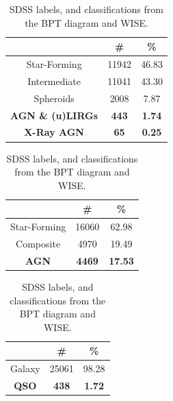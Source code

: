 \documentclass[letterpaper, oneside]{article}
\begin{document}
	\begin{table}[H]
		\begin{subtable}[h]{0.45\textwidth}
			\centering
			\begin{tabular}{ccc}
				\hline \hline
				& \# & \%      \\ \hline
				Star-Forming    & 11942         & 46.83 \\
				Intermediate    & 11041         & 43.30 \\
				Spheroids       & 2008          & 7.87  \\
				\textbf{AGN \& (u)LIRGs} & \textbf{443}           & \textbf{1.74}  \\
				\textbf{X-Ray AGN}       & \textbf{65}            & \textbf{0.25}  \\ \hline
			\end{tabular}
			\caption{Classifications from WISE imd-IR color selections by \cite{Jarrett_2017} and \cite{Mateos_2012, Mateos_2013}.}
			\label{tab:wise_labels}
		\end{subtable}
		\hfill
		\begin{subtable}[h]{0.45\textwidth}
			\centering
			\begin{tabular}{ccc}
				\hline \hline
				& \# & \% \\ \hline
				Star-Forming 		  & 16060         & 62.98            \\
				Composite   		  & 4970          & 19.49             \\
				\textbf{AGN}          & \textbf{4469}          & \textbf{17.53}             \\ \hline
			\end{tabular}
			\caption{Classifications from the BPT diagram.}
			\label{tab:bpt_labels_wise_subsample}
		\end{subtable}
		\hfill
		\begin{subtable}[h]{0.45\textwidth}
			\centering
			\begin{tabular}{ccc}
				\hline \hline
				& \# & \% \\ \hline
				Galaxy 		  & 25061         & 98.28        \\
				\textbf{QSO}          & \textbf{438}          & \textbf{1.72}             \\ \hline
			\end{tabular}
			\caption{SDSS classes.}
			\label{tab:sdss_classes_wise_subsample}
		\end{subtable}
		\caption{SDSS labels, and classifications from the BPT diagram and WISE.}
		\label{tab:WISE_vs_BPT_vs_SDSS_labels}
	\end{table}
\end{document}
